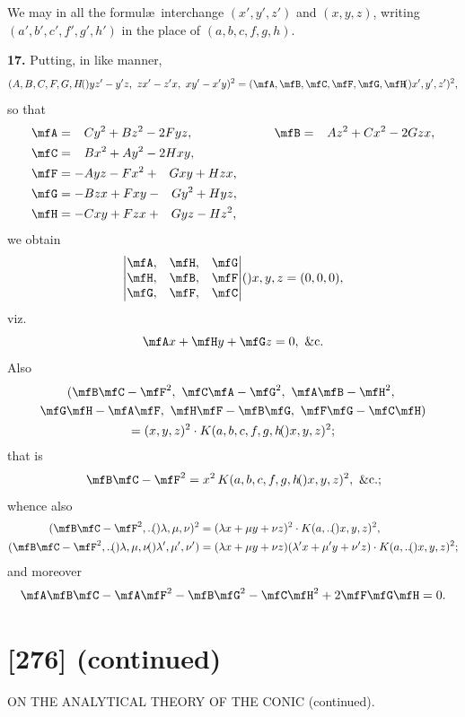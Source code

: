 \documentclass[11pt,a4paper]{book}
\providecommand{\qform}[1]{(#1)}
\begin{document}
We may in all the formul\ae\ interchange $(x', y', z')$ and $(x, y, z)$, writing $(a', b', c', f', g', h')$ in the place of $(a, b, c, f, g, h)$.

\textbf{17.} Putting, in like manner,
\[
(A, B, C, F, G, H \!\qform{}{yz' - y'z,\ zx' - z'x,\ xy' - x'y})^{2}
= (\mfA, \mfB, \mfC, \mfF, \mfG, \mfH \!\qform{}{x', y', z'})^{2},
\]
so that
\begin{alignat*}{3}
\mfA &= \phantom{-}Cy^{2} + Bz^{2} - 2Fyz, &\qquad
\mfB &= \phantom{-}Az^{2} + Cx^{2} - 2Gzx, \\
\mfC &= \phantom{-}Bx^{2} + Ay^{2} - 2Hxy, \\
\mfF &= -Ayz - Fx^{2} + \phantom{-}Gxy + Hzx, \\
\mfG &= -Bzx + Fxy - \phantom{-}Gy^{2} + Hyz, \\
\mfH &= -Cxy + Fzx + \phantom{-}Gyz - Hz^{2},
\end{alignat*}
we obtain
\[
\begin{vmatrix}
\mfA, & \mfH, & \mfG \\
\mfH, & \mfB, & \mfF \\
\mfG, & \mfF, & \mfC
\end{vmatrix}
\!\qform{}{x, y, z} = (0, 0, 0),
\]
viz.
\[
\mfA x + \mfH y + \mfG z = 0,\ \&\mathrm{c}.
\]
Also
\begin{multline*}
(\mfB\mfC - \mfF^{2},\ \mfC\mfA - \mfG^{2},\ \mfA\mfB - \mfH^{2},\ \\
\mfG\mfH - \mfA\mfF,\ \mfH\mfF - \mfB\mfG,\ \mfF\mfG - \mfC\mfH) \\
= (x, y, z)^{2} \cdot K(a, b, c, f, g, h \!\qform{}{x, y, z})^{2};
\end{multline*}
that is
\[
\mfB\mfC - \mfF^{2} = x^{2}\, K(a, b, c, f, g, h \!\qform{}{x, y, z})^{2},\ \&\mathrm{c}.;
\]
whence also
\begin{align*}
(\mfB\mfC - \mfF^{2},..\!\qform{}{\lambda, \mu, \nu})^{2}
&= (\lambda x + \mu y + \nu z)^{2} \cdot K(a,..\!\qform{}{x, y, z})^{2},\\
(\mfB\mfC - \mfF^{2},..\!\qform{}{\lambda, \mu, \nu}\!\qform{}{\lambda', \mu', \nu'})
&= (\lambda x + \mu y + \nu z)(\lambda' x + \mu' y + \nu' z) \cdot K(a,..\!\qform{}{x, y, z})^{2};
\end{align*}
and moreover
\[
\mfA\mfB\mfC - \mfA\mfF^{2} - \mfB\mfG^{2} - \mfC\mfH^{2} + 2\mfF\mfG\mfH = 0.
\]

\newpage
\section*{[276] (continued)}
\begin{center}
{\large ON THE ANALYTICAL THEORY OF THE CONIC (continued).}
\end{center}
\end{document}
